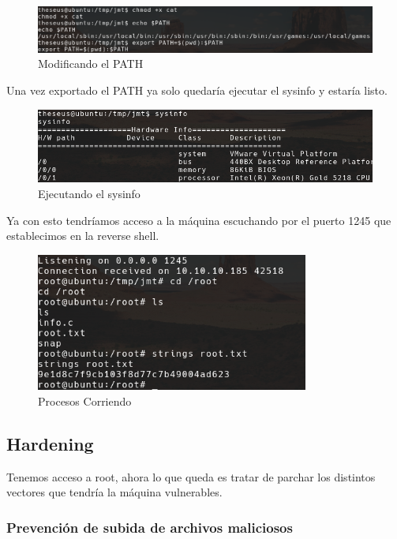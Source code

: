 \documentclass{article}
\begin{document}
\begin{figure}[h!]
	\center 
	\includegraphics[width=\textwidth]{images/magic/modificacion-path.png}
	\caption{Modificando el PATH}
\end{figure}

Una vez exportado el PATH ya solo quedaría ejecutar el sysinfo y estaría listo.

\begin{figure}[h!]
	\center 
	\includegraphics[width=\textwidth]{images/magic/ejecutando-sysinfo.png}
	\caption{Ejecutando el sysinfo}
\end{figure}

\clearpage

Ya con esto tendríamos acceso a la máquina escuchando por el puerto 1245 que establecimos en la reverse shell.

\begin{figure}[h!]
	\center 
	\includegraphics[width=0.8\textwidth]{images/magic/acceso-root.png}
	\caption{Procesos Corriendo}
\end{figure}

\subsection{Hardening}

Tenemos acceso a root, ahora lo que queda es tratar de parchar los distintos vectores que tendría la máquina vulnerables.

\subsubsection{Prevención de subida de archivos maliciosos}
\end{document}
